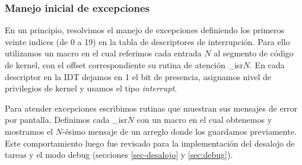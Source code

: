 \subsubsection{Manejo inicial de excepciones}

En un principio, resolvimos el manejo de excepciones definiendo los primeros veinte indices (de 0 a 19) en la tabla de descriptores de interrupción. 
Para ello utilizamos un macro en el cual referimos cada entrada $N$ al segmento de código de kernel, con el offset correspondiente su rutina de atención \_isr$N$. 
En cada descriptor en la IDT dejamos en 1 el bit de presencia, asignamos nivel de privilegios de kernel y usamos el tipo \textit{interrupt}.

Para atender excepciones escribimos rutinas que muestran sus mensajes de error por pantalla.
Definimos cada \_isr$N$ con un macro en el cual obtenemos y mostramos el $N$-ésimo mensaje de un arreglo donde los guardamos previamente.\\

Este comportamiento luego fue revisado para la implementación del desalojo de tareas y el modo debug (secciones \ref{sec-desalojo} y \ref{sec:debug}).
